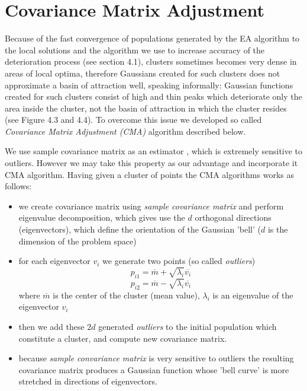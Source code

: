 \section{Covariance Matrix Adjustment}
Because of the fast convergence of populations
generated by the EA algorithm to the local solutions and the algorithm we use
to increase accuracy of the deterioration process (see section 4.1),
clusters sometimes becomes very dense in areas of local optima, therefore Gaussians created for such
clusters does not approximate a basin of attraction well, speaking informally:
Gaussian functions created for such clusters consist of high and thin peaks
which deteriorate only the area inside the cluster, not the basin of attraction
in which the cluster resides (see Figure 4.3 and 4.4).
To overcome this issue we developed so called \textit{Covariance Matrix
Adjustment (CMA)} algorithm described below.

We use sample covariance matrix as an estimator \cite{covariance}, which is 
extremely sensitive to outliers. However we may take this property as our
advantage and incorporate it CMA algorithm. 
Having given a cluster of points the CMA algorithms works as follows:

\begin{itemize}
  \item we create covariance matrix using \textit{sample covariance matrix}
  \cite{covariance} and perform eigenvalue decomposition, which gives use the
  $d$ orthogonal directions (eigenvectors), which define the orientation of the 
  Gaussian 'bell' ($d$ is the dimension of the problem space)
  \item for each eigenvector $v_i$ we generate two points (so called
  \textit{outliers})
  \begin{equation}
  	p_{i1} = \overline{m} + \sqrt{\lambda_i}\overline{v_i}
  \end{equation} 
  \begin{equation}
  	p_{i2} = \overline{m} - \sqrt{\lambda_i}\overline{v_i}
  \end{equation} 
  where $\overline{m}$ is the center of the cluster (mean value), $\lambda_i$ is
  an eigenvalue of the eigenvector $v_i$
  \item then we add these $2d$ generated \textit{outliers} to the initial
  population which constitute a cluster, and compute new covariance matrix.
  \item because \textit{sample convariance matrix} is very sensitive to outliers
  the resulting covariance matrix produces a Gaussian function whose 'bell
  curve' is more stretched in directions of eigenvectors.
  \end{itemize}

